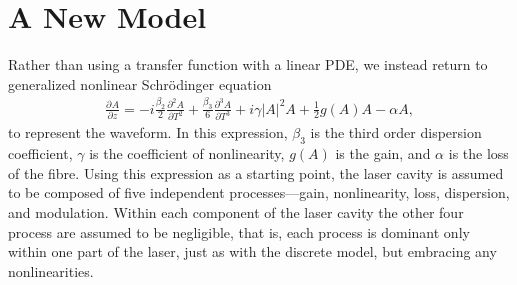 \documentclass[12pt]{article}
\newcommand{\pdiff}[3][]{\frac{\partial^{#1}#2}{\partial{#3}^{#1}}}
\begin{document}
\section{A New Model}
Rather than using a transfer function with a linear PDE, we instead return to generalized nonlinear 
Schr\"odinger equation~\cite{agrawal2013, ferreira, shtyrina, yarutkina} 
\begin{align}
\label{eq:nlse}
\pdiff{A}{z} = - i \frac{\beta_2}{2}\pdiff[2]{A}{T} + \frac{\beta_3}{6}\pdiff[3]{A}{T} 
+ i \gamma |A|^2 A + \frac{1}{2}g(A) A - \alpha A,
\end{align}
to represent the waveform.  In this expression, $\beta_3$ is the third order dispersion coefficient, 
$\gamma$ is the coefficient of nonlinearity, $g(A)$ is the gain, and $\alpha$ is the loss of the fibre.
Using this expression as a starting point, the laser cavity is assumed to be composed of five independent 
processes---gain, nonlinearity, loss, dispersion, and modulation. 
Within each component of the laser cavity the other four process are assumed to be negligible, that is, 
each process is dominant only within one part of the laser, just as with the discrete model, but embracing
any nonlinearities.
\end{document}
